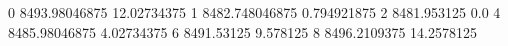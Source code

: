 0 8493.98046875 12.02734375
1 8482.748046875 0.794921875
2 8481.953125 0.0
4 8485.98046875 4.02734375
6 8491.53125 9.578125
8 8496.2109375 14.2578125
